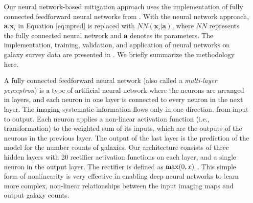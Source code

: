 Our neural network-based mitigation approach uses the implementation of fully connected feedforward neural networks from \cite{rezaie2021primordial}. With the neural network approach, $\textbf{a}.\textbf{x}_{i}$ in Equation \ref{eq:npred} is replaced with $NN(\textbf{x}_{i}|\textbf{a})$, where $NN$ represents the fully connected neural network and $\textbf{a}$ denotes its parameters. The implementation, training, validation, and application of neural networks on galaxy survey data are presented in \cite{rezaie2021primordial}. We briefly summarize the methodology here. 

A fully connected feedforward neural network (also called a \textit{multi-layer perceptron}) is a type of artificial neural network where the neurons are arranged in layers, and each neuron in one layer is connected to every neuron in the next layer. The imaging systematic information flows only in one direction, from input to output. Each neuron applies a non-linear activation function (i.e., transformation) to the weighted sum of its inputs, which are the outputs of the neurons in the previous layer. The output of the last layer is the prediction of the model for the number counts of galaxies. Our architecture consists of three hidden layers with 20 rectifier activation functions on each layer, and a single neuron in the output layer. The rectifier is defined as ${\rm max}(0, x)$ \citep{nair2010rectified}. This simple form of nonlinearity is very effective in enabling deep neural networks to learn more complex, non-linear relationships between the input imaging maps and output galaxy counts.

